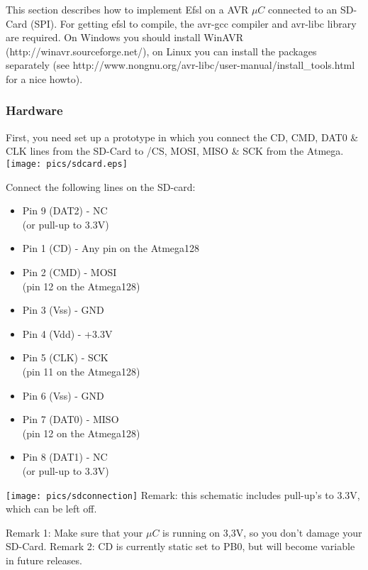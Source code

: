 This section describes how to implement Efsl on a AVR $\mu C$ connected to
an SD-Card (SPI). For getting efsl to compile, the avr-gcc compiler and
avr-libc library are required. On Windows you should install WinAVR
(http://winavr.sourceforge.net/), on Linux you can install the packages
separately (see http://www.nongnu.org/avr-libc/user-manual/install\_tools.html
for a nice howto).
\subsubsection{Hardware}
First, you need set up a prototype in which you connect the CD, CMD, DAT0
\& CLK lines from the SD-Card to /CS, MOSI, MISO \& SCK from the Atmega.
\newline
\texttt{[image: pics/sdcard.eps]}
\newline
\parbox[c]{.5\textwidth}{
Connect the following lines on the SD-card:
\begin{itemize}
	\item{Pin 9 (DAT2) - NC\\(or pull-up to 3.3V)}
	\item{Pin 1 (CD) - Any pin on the Atmega128}
	\item{Pin 2 (CMD) - MOSI\\(pin 12 on the Atmega128)}
	\item{Pin 3 (Vss) - GND}
	\item{Pin 4 (Vdd) - +3.3V}
	\item{Pin 5 (CLK) - SCK\\(pin 11 on the Atmega128)}
	\item{Pin 6 (Vss) - GND}
	\item{Pin 7 (DAT0) - MISO\\(pin 12 on the Atmega128)}
	\item{Pin 8 (DAT1) - NC\\(or pull-up to 3.3V)}
\end{itemize}
}
\parbox[c]{.5\textwidth}{\begin{center}
	\texttt{[image: pics/sdconnection]}
	\newline\newline
	Remark: this schematic includes pull-up's to 3.3V, which
	can be left off.
\end{center}}
\newline
Remark 1: Make sure that your $\mu C$ is running on 3,3V, so you don't
damage your SD-Card.\newline
\newline
Remark 2: CD is currently static set to PB0, but will become variable
in future releases.
